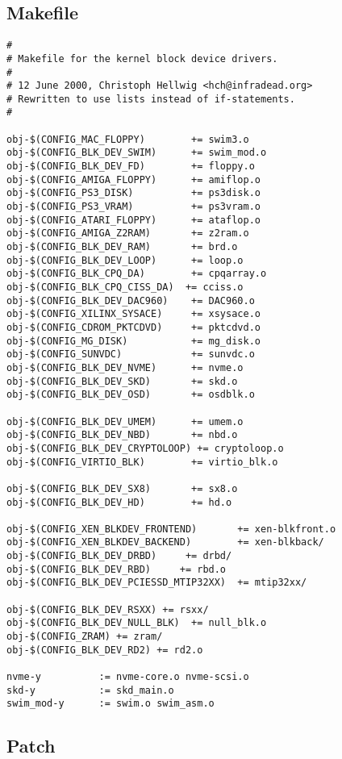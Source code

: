 \documentclass[journal,10pt,onecolumn,compsoc,letterpaper,draftclsnofoot,table,xcdraw]{IEEEtran} \usepackage[margin=0.75in]{geometry}
\begin{document}
\subsection{Makefile}
\begin{verbatim}
#
# Makefile for the kernel block device drivers.
#
# 12 June 2000, Christoph Hellwig <hch@infradead.org>
# Rewritten to use lists instead of if-statements.
#

obj-$(CONFIG_MAC_FLOPPY)        += swim3.o
obj-$(CONFIG_BLK_DEV_SWIM)      += swim_mod.o
obj-$(CONFIG_BLK_DEV_FD)        += floppy.o
obj-$(CONFIG_AMIGA_FLOPPY)      += amiflop.o
obj-$(CONFIG_PS3_DISK)          += ps3disk.o
obj-$(CONFIG_PS3_VRAM)          += ps3vram.o
obj-$(CONFIG_ATARI_FLOPPY)      += ataflop.o
obj-$(CONFIG_AMIGA_Z2RAM)       += z2ram.o
obj-$(CONFIG_BLK_DEV_RAM)       += brd.o
obj-$(CONFIG_BLK_DEV_LOOP)      += loop.o
obj-$(CONFIG_BLK_CPQ_DA)        += cpqarray.o
obj-$(CONFIG_BLK_CPQ_CISS_DA)  += cciss.o
obj-$(CONFIG_BLK_DEV_DAC960)    += DAC960.o
obj-$(CONFIG_XILINX_SYSACE)     += xsysace.o
obj-$(CONFIG_CDROM_PKTCDVD)     += pktcdvd.o
obj-$(CONFIG_MG_DISK)           += mg_disk.o
obj-$(CONFIG_SUNVDC)            += sunvdc.o
obj-$(CONFIG_BLK_DEV_NVME)      += nvme.o
obj-$(CONFIG_BLK_DEV_SKD)       += skd.o
obj-$(CONFIG_BLK_DEV_OSD)       += osdblk.o

obj-$(CONFIG_BLK_DEV_UMEM)      += umem.o
obj-$(CONFIG_BLK_DEV_NBD)       += nbd.o
obj-$(CONFIG_BLK_DEV_CRYPTOLOOP) += cryptoloop.o
obj-$(CONFIG_VIRTIO_BLK)        += virtio_blk.o

obj-$(CONFIG_BLK_DEV_SX8)       += sx8.o
obj-$(CONFIG_BLK_DEV_HD)        += hd.o

obj-$(CONFIG_XEN_BLKDEV_FRONTEND)       += xen-blkfront.o
obj-$(CONFIG_XEN_BLKDEV_BACKEND)        += xen-blkback/
obj-$(CONFIG_BLK_DEV_DRBD)     += drbd/
obj-$(CONFIG_BLK_DEV_RBD)     += rbd.o
obj-$(CONFIG_BLK_DEV_PCIESSD_MTIP32XX)  += mtip32xx/

obj-$(CONFIG_BLK_DEV_RSXX) += rsxx/
obj-$(CONFIG_BLK_DEV_NULL_BLK)  += null_blk.o
obj-$(CONFIG_ZRAM) += zram/
obj-$(CONFIG_BLK_DEV_RD2) += rd2.o

nvme-y          := nvme-core.o nvme-scsi.o
skd-y           := skd_main.o
swim_mod-y      := swim.o swim_asm.o
\end{verbatim}

\subsection{Patch}
\begin{verbatim}
\end{verbatim}
\end{document}
